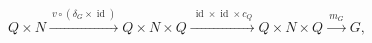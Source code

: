 \(
Q\times N
\xrightarrow{\ v\circ(\delta_G\times\operatorname{id})\ }
Q\times N\times Q
\xrightarrow{\ \operatorname{id}\times\operatorname{id}\times c_Q\ }
Q\times N\times Q
\xrightarrow{\ m_G\ }G,
\)
